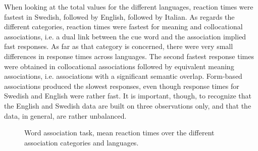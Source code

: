 \documentclass[output=paper,colorlinks,citecolor=brown,nonflat]{langsci/langscibook}
\begin{document}
When looking at the total values for the different languages, reaction times were fastest in Swedish, followed by English, followed by Italian. As regards the different categories, reaction times were fastest for meaning and collocational associations, i.e. a dual link between the cue word and the association implied fast responses. As far as that category is concerned, there were very small differences in response times across languages. The second fastest response times were obtained in collocational associations followed by equivalent meaning associations, i.e. associations with a significant semantic overlap. Form-based associations produced the slowest responses, even though response times for Swedish and English were rather fast. It is important, though, to recognize that the English and Swedish data are built on three observations only, and that the data, in general, are rather unbalanced.

\begin{figure}
\dataset
{}

    \caption{Word association task, mean reaction times over the different association categories and languages.}
    \label{fig:gudmundson:4}
\end{figure}
\end{document}
